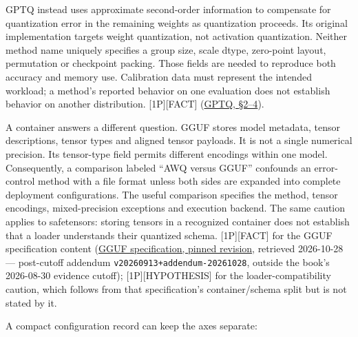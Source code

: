 GPTQ instead uses approximate second-order information to compensate for
quantization error in the remaining weights as quantization proceeds.
Its original implementation targets weight quantization, not activation
quantization. Neither method name uniquely specifies a group size, scale
dtype, zero-point layout, permutation or checkpoint packing. Those
fields are needed to reproduce both accuracy and memory use. Calibration
data must represent the intended workload; a method's reported behavior
on one evaluation does not establish behavior on another distribution.
\mbox{{[}1P{]}}\hspace{0pt}\mbox{{[}FACT{]}} (\href{https://arxiv.org/pdf/2210.17323v2}{GPTQ,
§2--4}).

A container answers a different question. GGUF stores model metadata,
tensor descriptions, tensor types and aligned tensor payloads. It is not
a single numerical precision. Its tensor-type field permits different
encodings within one model. Consequently, a comparison labeled ``AWQ
versus GGUF'' confounds an error-control method with a file format
unless both sides are expanded into complete deployment configurations.
The useful comparison specifies the method, tensor encodings,
mixed-precision exceptions and execution backend. The same caution
applies to safetensors: storing tensors in a recognized container does
not establish that a loader understands their quantized schema.
\mbox{{[}1P{]}}\hspace{0pt}\mbox{{[}FACT{]}} for the GGUF specification content
(\href{https://github.com/ggml-org/ggml/blob/da8e2a54b919557b816b1c2beb432ccb766f7ce0/docs/gguf.md}{GGUF
specification, pinned revision}, retrieved 2026-10-28 --- post-cutoff
addendum \texttt{v20260913+addendum-20261028}, outside the book's
2026-08-30 evidence cutoff); \mbox{{[}1P{]}}\hspace{0pt}\mbox{{[}HYPOTHESIS{]}} for the
loader-compatibility caution, which follows from that specification's
container/schema split but is not stated by it.

A compact configuration record can keep the axes separate:

